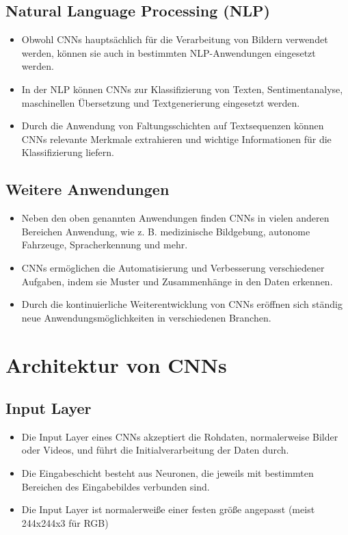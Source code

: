 \subsection{Natural Language Processing (NLP)}
\begin{itemize}
  \item Obwohl CNNs hauptsächlich für die Verarbeitung von Bildern verwendet werden, können sie auch in bestimmten NLP-Anwendungen eingesetzt werden.
  \item In der NLP können CNNs zur Klassifizierung von Texten, Sentimentanalyse, maschinellen Übersetzung und Textgenerierung eingesetzt werden.
  \item Durch die Anwendung von Faltungsschichten auf Textsequenzen können CNNs relevante Merkmale extrahieren und wichtige Informationen für die Klassifizierung liefern.
\end{itemize}

\subsection{Weitere Anwendungen}
\begin{itemize}
  \item Neben den oben genannten Anwendungen finden CNNs in vielen anderen Bereichen Anwendung, wie z. B. medizinische Bildgebung, autonome Fahrzeuge, Spracherkennung und mehr.
  \item CNNs ermöglichen die Automatisierung und Verbesserung verschiedener Aufgaben, indem sie Muster und Zusammenhänge in den Daten erkennen.
  \item Durch die kontinuierliche Weiterentwicklung von CNNs eröffnen sich ständig neue Anwendungsmöglichkeiten in verschiedenen Branchen.
\end{itemize}

\section{Architektur von CNNs}

\subsection{Input Layer}
\begin{itemize}
  \item Die Input Layer eines CNNs akzeptiert die Rohdaten, normalerweise Bilder oder Videos, und führt die Initialverarbeitung der Daten durch.
  \item Die Eingabeschicht besteht aus Neuronen, die jeweils mit bestimmten Bereichen des Eingabebildes verbunden sind.
  \item Die Input Layer ist normalerweiße einer festen größe angepasst (meist 244x244x3 für RGB)
\end{itemize}

